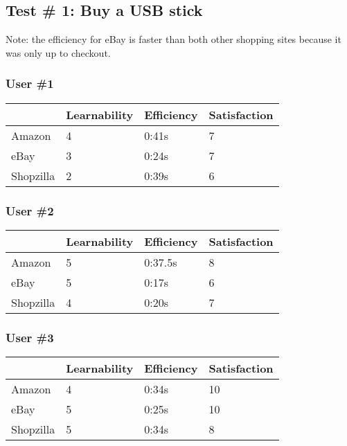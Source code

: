 \documentclass[11pt, oneside]{article}   	%
\begin{document}
\subsection{Test \# 1: Buy a USB stick}

Note: the efficiency for eBay is faster than both other shopping sites because it was only up to checkout.

\subsubsection{User \#1}

\begin{tabular}{| l | l | l | l |}
    \hline
     & Learnability & Efficiency & Satisfaction \\ \hline
    Amazon & 4 & 0:41s & 7 \\ \hline
    eBay & 3 & 0:24s & 7 \\ \hline
    Shopzilla & 2 & 0:39s & 6 \\\hline
\end{tabular}

\subsubsection{User \#2}

\begin{tabular}{| l | l | l | l |}
    \hline
     & Learnability & Efficiency & Satisfaction \\ \hline
    Amazon & 5 & 0:37.5s & 8 \\ \hline
    eBay & 5 & 0:17s & 6 \\ \hline
    Shopzilla & 4 & 0:20s & 7 \\ \hline
\end{tabular}

\subsubsection{User \#3}

\begin{tabular}{| l | l | l | l |}
    \hline
     & Learnability & Efficiency & Satisfaction \\ \hline
    Amazon & 4 & 0:34s & 10 \\ \hline
    eBay & 5 & 0:25s & 10 \\ \hline
    Shopzilla & 5 & 0:34s & 8 \\ \hline
\end{tabular}
\end{document}
